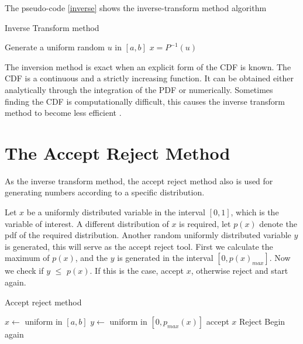     
The pseudo-code \ref{inverse} shows the inverse-transform method algorithm 
\begin{algorithm}
\caption{Inverse Transform method}\label{inverse}
\begin{algorithmic}
\State Generate a uniform  random $u$ in $[a,b]$
\State \Return $x = P^{-1}(u)$
\end{algorithmic}
\end{algorithm}
The inversion method is exact when an explicit form of the CDF is known. The CDF is a continuous and a strictly increasing function. It can be obtained either analytically through the integration of the PDF or numerically. Sometimes finding the CDF is computationally difficult, this causes the inverse transform method to become less efficient \citep{Devroye:1986:SNR:318242.318443}.

\section{The Accept Reject Method}
As the inverse transform method, the accept reject method also is used for generating numbers according to a specific distribution.

Let $x$ be a uniformly distributed variable in the interval $[0,1]$, which is the variable of interest. A different distribution of $x$ is required, let $p(x)$ denote the pdf of the required distribution. Another  random uniformly distributed variable $y$ is generated, this will serve as the accept reject tool. First we calculate the maximum of $p(x)$, and the $y$ is generated in the interval $[0,p(x)_{max}]$. Now we check if $y$ $\leq$ $p(x)$. If this is the case, accept $x$, otherwise reject and start again. 
\begin{algorithm}
\caption{Accept reject method}
\begin{algorithmic} 
\State $x \gets$ uniform in $[a, b]$
\State $y \gets$ uniform in $[0, p_{max}(x)]$
    \State accept $x$
\Else 
	\State Reject 
\EndIf
\State Begin again
\end{algorithmic}
\end{algorithm}
% 

